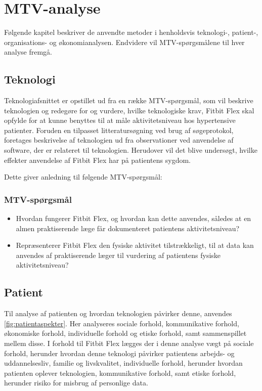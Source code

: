 \chapter{MTV-analyse}
Følgende kapitel beskriver de anvendte metoder i henholdsvis teknologi-, patient-, organisations- og økonomianalysen. Endvidere vil MTV-spørgsmålene til hver analyse fremgå. 

\section{Teknologi}\label{sec:metode_tek}
Teknologiafsnittet er opstillet ud fra en række MTV-spørgsmål, som vil beskrive teknologien og redegøre for og vurdere, hvilke teknologiske krav, Fitbit Flex skal opfylde for at kunne benyttes til at måle aktivitetsniveau hos hypertensive patienter. 
Foruden en tilpasset litteratursøgning ved brug af søgeprotokol, foretages beskrivelse af teknologien ud fra observationer ved anvendelse af software, der er relateret til teknologien.   
Herudover vil det blive undersøgt, hvilke effekter anvendelse af Fitbit Flex har på patientens sygdom.
 
\noindent
Dette giver anledning til følgende MTV-spørgsmål: 
\subsection{MTV-spørgsmål}
\begin{itemize}
\item Hvordan fungerer Fitbit Flex, og hvordan kan dette anvendes, således at en almen praktiserende læge får dokumenteret patientens aktivitetsniveau?
\item Repræsenterer Fitbit Flex den fysiske aktivitet tilstrækkeligt, til at data kan anvendes af praktiserende læger til vurdering af patientens fysiske aktivitetsniveau?
\end{itemize}

\section{Patient}\label{sec:metode_pat}
Til analyse af patienten og hvordan teknologien påvirker denne, anvendes \autoref{fig:patientaspekter}. Her analyseres sociale forhold, kommunikative forhold, økonomiske forhold, individuelle forhold og etiske forhold, samt sammenspillet mellem disse. I forhold til Fitbit Flex lægges der i denne analyse vægt på sociale forhold, herunder hvordan denne teknologi påvirker patientens arbejds- og uddannelsesliv, familie og livskvalitet, individuelle forhold, herunder hvordan patienten oplever teknologien, kommunikative forhold, samt etiske forhold, herunder risiko for misbrug af personlige data. 


